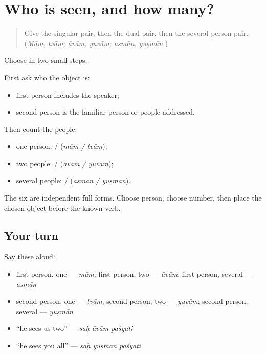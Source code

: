 \section[(object person and number)]{Who is seen, and how many?}

\label{lesson:SA-C262-object-person-number}



\begin{quote}
Give the singular pair, then the dual pair, then the several-person pair. (\emph{Mām, tvām; āvām, yuvām; asmān, yuṣmān.})
\end{quote}

\begin{grammarlens}[title={Grammar Lens: person first, then number}]
Choose in two small steps.

First ask who the object is:

\begin{itemize}
\raggedright
  \item first person includes the speaker;
  \item second person is the familiar person or people addressed.
\end{itemize}

Then count the people:

\begin{itemize}
\raggedright
  \item one person: \textbf{} / \textbf{} (\emph{mām / tvām});
  \item two people: \textbf{} / \textbf{} (\emph{āvām / yuvām});
  \item several people: \textbf{} / \textbf{} (\emph{asmān / yuṣmān}).
\end{itemize}

The six are independent full forms. Choose person, choose number, then place the chosen object before the known verb.
\end{grammarlens}

\subsection*{Your turn}
Say these aloud:

\begin{itemize}
\raggedright
  \item first person, one — \emph{mām}; first person, two — \emph{āvām}; first person, several — \emph{asmān}
  \item second person, one — \emph{tvām}; second person, two — \emph{yuvām}; second person, several — \emph{yuṣmān}
  \item “he sees us two” — \emph{saḥ āvām paśyati}
  \item “he sees you all” — \emph{saḥ yuṣmān paśyati}
\end{itemize}

